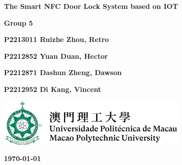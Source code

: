 \documentclass[11pt, a4paper]{article}
\begin{document}
\begin{titlepage}
    \begin{center}
        \vspace*{1.5cm}

        \Huge
        \textbf{The Smart NFC Door Lock System based on IOT}

        \vspace{3cm}
        \huge



        \vspace{2cm}
        \Large

        \textbf{Group 5}                                         %

        \vspace{1.5cm}

        \textbf{P2213011 Ruizhe Zhou, Retro}                     %

        \textbf{P2212852 Yuan Duan, Hector}                      %

        \textbf{P2212871 Dashun Zheng, Dawson}                   %

        \textbf{P2212952 Di Kang, Vincent}                       %


        \vfill



        \vspace{1cm}

        \includegraphics[width=0.7\textwidth]{logo-mpu.png}
        \\

        \Large

        \textbf{\today}

    \end{center}
\end{titlepage}

\newpage

\vspace{1cm}

\begin{center}

    \tableofcontents

\end{center}
\end{document}
